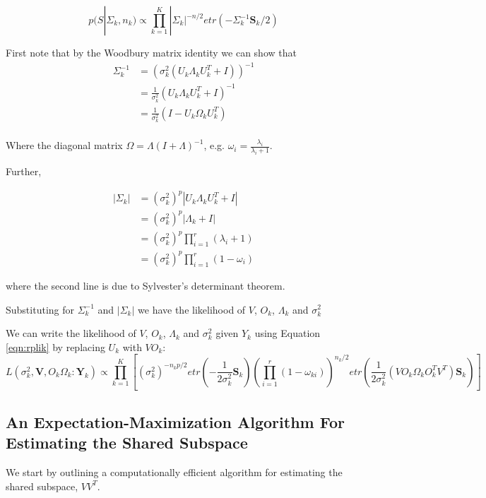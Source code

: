 \documentclass{article}
\newcommand{\bl}[1]{{\mathbf #1}}
\begin{document}
\begin{equation}
p(S | \Sigma_k,n_k) \propto \prod_{k=1}^K |\Sigma_k|^{-n/2}etr(-\Sigma_k^{-1}\mathbf{S}_k/2)
\end{equation}

First note that by the Woodbury matrix identity we can show that 
\begin{align}
\Sigma^{-1}_k &=  (\sigma_k^2(U_k\Lambda_kU_k^T+I))^{-1}\\
&= \frac{1}{\sigma_k^2}(U_k\Lambda_kU_k^T+I)^{-1}\\
&= \frac{1}{\sigma_k^2}(I-U_k\Omega_kU_k^T)\\
\end{align}

Where the diagonal matrix $\Omega = \Lambda(I+\Lambda)^{-1}$, e.g. $\omega_i = \frac{\lambda_i}{\lambda_{i}+1}$.  

 Further, 

\begin{align}
|\Sigma_k| &= (\sigma_k^2)^{p}|U_k\Lambda_kU_k^T+I|\\
&= (\sigma_k^2)^{p}|\Lambda_k+I| \\
&= (\sigma_k^2)^{p}\prod_{i=1}^r(\lambda_i+1)\\
&= (\sigma_k^2)^{p}\prod_{i=1}^r(1-\omega_i)
\end{align}

where the second line is due to Sylvester's determinant theorem.

Substituting for $\Sigma^{-1}_k$ and $|\Sigma_k|$ we have the likelihood of $V$, $O_k$, $\Lambda_k$ and $\sigma_k^2$

We can write the likelihood of $V$, $O_k$, $\Lambda_k$ and
$\sigma_k^2$ given $Y_k$ using Equation \ref{eqn:rplik} by replacing
$U_k$ with $VO_k$: 
\begin{equation}
 L(\sigma_k^2,\bl V , O_k \Omega_k : \bl Y_k) \propto \prod_{k=1}^K\left[ (\sigma_k^2)^{-n_kp/2}etr(-\frac{1}{2\sigma_k^2}\mathbf{S}_k)\left(\prod_{i=1}^r(1-\omega_{ki}) \right) ^{n_k/2}  etr(\frac{1}{2\sigma_k^2}(VO_k\Omega_kO_k^TV^T)\mathbf{S}_k) \right]
\end{equation}


\subsection*{An Expectation-Maximization Algorithm For Estimating the Shared Subspace}

We start by outlining a computationally efficient algorithm for
estimating the shared subspace, $VV^T$.  
\end{document}
